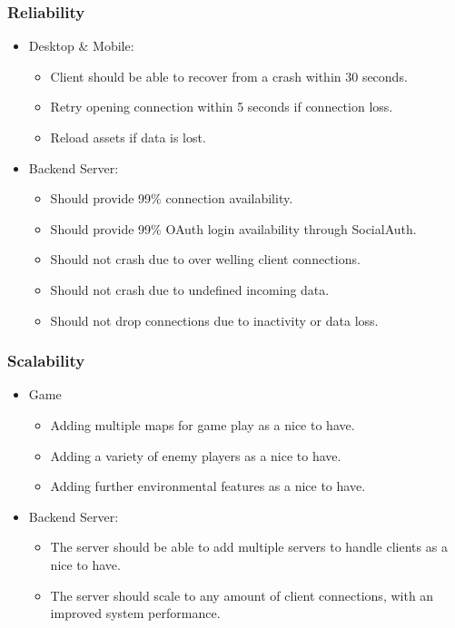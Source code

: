 \documentclass[letterpaper]{article}
\begin{document}
				\subsubsection*{Reliability}
				\vspace{0.1in}
				
					\begin{itemize}
						\item Desktop \& Mobile:
							\begin{itemize}
								\item Client should be able to recover from a crash within 30 seconds.
								\item Retry opening connection within 5 seconds if connection loss.
								\item Reload assets if data is lost.
							\end{itemize}
						\item Backend Server:
							\begin{itemize}
								\item Should provide 99\% connection availability.
								\item Should provide 99\% OAuth login availability through SocialAuth.
								\item Should not crash due to over welling client connections.
								\item Should not crash due to undefined incoming data.
								\item Should not drop connections due to inactivity or data loss.
							\end{itemize}
					\end{itemize}
					
				\subsubsection*{Scalability}
				\vspace{0.1in}
					
					\begin{itemize}
						\item Game
							\begin{itemize}
								\item Adding multiple maps for game play as a nice to have.
								\item Adding a variety of enemy players as a nice to have.
								\item Adding further environmental features as a nice to have.
							\end{itemize}
						\item Backend Server:
							\begin{itemize}
								\item The server should be able to add multiple servers to handle clients as a nice to have.
								\item The server should scale to any amount of client connections, with an improved system performance.
							\end{itemize}
					\end{itemize}
				
\end{document}
